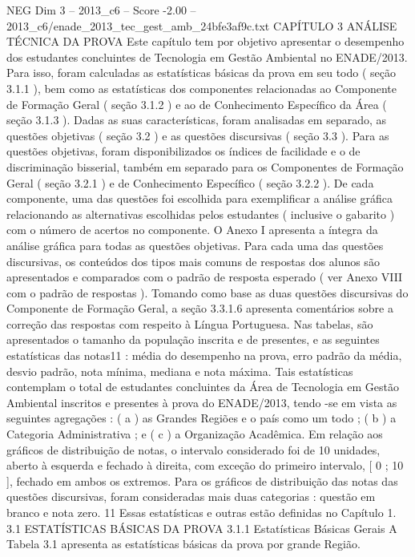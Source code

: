 \begin{textsample}{NEG Dim 3 – 2013\_c6 – Score -2.00 – 2013\_c6/enade\_2013\_tec\_gest\_amb\_24bfe3af9c.txt}  \label{ex:f3_neg_053}
CAPÍTULO 3 ANÁLISE TÉCNICA DA PROVA Este capítulo tem por objetivo apresentar o desempenho dos estudantes concluintes de Tecnologia em Gestão Ambiental no ENADE/2013.
Para isso, foram calculadas as estatísticas básicas da prova em seu todo ( seção 3.1.1 ), bem como as estatísticas dos componentes relacionadas ao Componente de Formação Geral ( seção 3.1.2 ) e ao de Conhecimento Específico da Área ( seção 3.1.3 ).
Dadas as suas características, foram analisadas em separado, as questões objetivas ( seção 3.2 ) e as questões discursivas ( seção 3.3 ).
Para as questões objetivas, foram disponibilizados os índices de facilidade e o de discriminação bisserial, também em separado para os Componentes de Formação Geral ( seção 3.2.1 ) e de Conhecimento Específico ( seção 3.2.2 ).
De cada componente, uma das questões foi escolhida para exemplificar a análise gráfica relacionando as alternativas escolhidas pelos estudantes ( inclusive o gabarito ) com o número de acertos no componente.
O Anexo I apresenta a íntegra da análise gráfica para todas as questões objetivas.
Para cada uma das questões discursivas, os conteúdos dos tipos mais comuns de respostas dos alunos são apresentados e comparados com o padrão de resposta esperado ( ver Anexo VIII com o padrão de respostas ).
Tomando como base as duas questões discursivas do Componente de Formação Geral, a seção 3.3.1.6 apresenta comentários sobre a correção das respostas com respeito à Língua Portuguesa.
Nas tabelas, são apresentados o tamanho da população inscrita e de presentes, e as seguintes estatísticas das notas11 : média do desempenho na prova, erro padrão da média, desvio padrão, nota mínima, mediana e nota máxima.
Tais estatísticas contemplam o total de estudantes concluintes da Área de Tecnologia em Gestão Ambiental inscritos e presentes à prova do ENADE/2013, tendo -se em vista as seguintes agregações : ( a ) as Grandes Regiões e o país como um todo ; ( b ) a Categoria Administrativa ; e ( c ) a Organização Acadêmica.
Em relação aos gráficos de distribuição de notas, o intervalo considerado foi de 10 unidades, aberto à esquerda e fechado à direita, com exceção do primeiro intervalo, [ 0 ; 10 ], fechado em ambos os extremos.
Para os gráficos de distribuição das notas das questões discursivas, foram consideradas mais duas categorias : questão em branco e nota zero. 11 Essas estatísticas e outras estão definidas no Capítulo 1. 3.1 ESTATÍSTICAS BÁSICAS DA PROVA 3.1.1 Estatísticas Básicas Gerais A Tabela 3.1 apresenta as estatísticas básicas da prova por grande Região.

\end{textsample}
